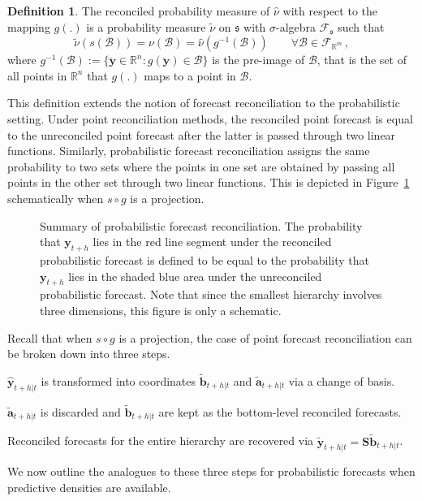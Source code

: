 \documentclass[12pt]{article}
\theoremstyle{definition}
\newtheorem{definition}{Definition}[section]
\begin{document}
\begin{definition} \label{def:reconprob}
  The reconciled probability measure of $\hat{\nu}$ with respect to the mapping $g(.)$ is a probability measure $\tilde{\nu}$ on $\mathfrak{s}$ with $\sigma$-algebra $\mathscr{F}_\mathfrak{s}$ such that
  \begin{equation}
  \tilde{\nu}(s(\mathcal{B})) = \nu(\mathcal{B})= \hat{\nu}(g^{-1}(\mathcal{B})) \qquad \forall \mathcal{B} \in \mathscr{F}_{\mathbb{R}^m}\,,
  \end{equation}
  where $g^{-1}(\mathcal{B}):=\{\breve{\bm{y}}\in \mathbb{R}^n:g(\breve{\bm{y}})\in \mathcal{B}\}$ is the pre-image of $\mathcal{B}$, that is the set of all points in $\mathbb{R}^n$ that $g(.)$ maps to a point in $\mathcal{B}$.
\end{definition}

This definition extends the notion of forecast reconciliation to the probabilistic setting. Under point reconciliation methods, the reconciled point forecast is equal to the unreconciled point forecast after the latter is passed through two linear functions. Similarly, probabilistic forecast reconciliation assigns the same probability to two sets where the points in one set are obtained by passing all points in the other set through two linear functions. This is depicted in Figure~\ref{fig:probfr_sch} schematically when $s\circ g$ is a projection.

\begin{figure}
	
	\caption{Summary of probabilistic forecast reconciliation. The probability that $\bm{y}_{t+h}$ lies in the red line segment under the reconciled probabilistic forecast is defined to be equal to the probability that $\bm{y}_{t+h}$ lies in the shaded blue area under the unreconciled probabilistic forecast. Note that since the smallest hierarchy involves three dimensions, this figure is only a schematic.}\label{fig:probfr_sch}
\end{figure}

Recall that when $s\circ g$ is a projection, the case of point forecast reconciliation can be broken down into three steps.
\begin{compactenum}
\item  $\hat{\bm{y}}_{t+h|t}$ is transformed into coordinates $\tilde{\bm{b}}_{t+h|t}$ and $\tilde{\bm{a}}_{t+h|t}$ via a change of basis.
\item $\tilde{\bm{a}}_{t+h|t}$ is discarded and $\tilde{\bm{b}}_{t+h|t}$ are kept as the bottom-level reconciled forecasts.
\item Reconciled forecasts for the entire hierarchy are recovered via $\tilde{\bm{y}}_{t+h|t}=\bm{S}\tilde{\bm{b}}_{t+h|t}$.
\end{compactenum}
We now outline the analogues to these three steps for probabilistic forecasts when predictive densities are available.
\end{document}
